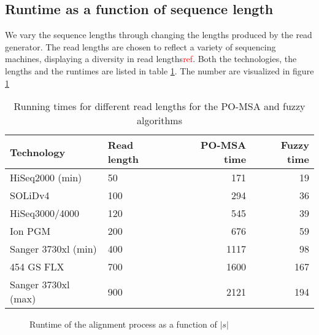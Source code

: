 \documentclass[thesis.tex]{subfiles}
\begin{document}
\subsection*{Runtime as a function of sequence length}
We vary the sequence lengths through changing the lengths produced by the read generator. The read lengths are chosen to reflect a variety of sequencing machines, displaying a diversity in read lengths\textcolor{red}{ref}. Both the technologies, the lengths and the runtimes are listed in table \ref{tab:runtimes_s}. The number are visualized in figure \ref{fig:runtime_s}
\begin{table}[!h]
  \begin{tabular}{|l|l|r|r|}
    \hline \textbf{Technology} & \textbf{Read length} & \textbf{PO-MSA time} & \textbf{Fuzzy time} \\ \hline
    HiSeq2000 (min) & 50 & 171 & 19 \\ \hline
    SOLiDv4 & 100 & 294 & 36 \\ \hline
    HiSeq3000/4000 & 120 & 545 & 39 \\ \hline
    Ion PGM & 200 & 676 & 59 \\ \hline
    Sanger 3730xl (min) & 400 & 1117 & 98 \\ \hline
    454 GS FLX & 700 & 1600 & 167 \\ \hline
    Sanger 3730xl (max) & 900 & 2121 & 194 \\ \hline
  \end{tabular}
  \caption{Running times for different read lengths for the PO-MSA and fuzzy algorithms}
  \label{tab:runtimes_s}
\end{table}
\begin{figure}[!hb]
  \caption{Runtime of the alignment process as a function of $|s|$}
  \label{fig:runtime_s}
\end{figure}
\clearpage
\end{document}
